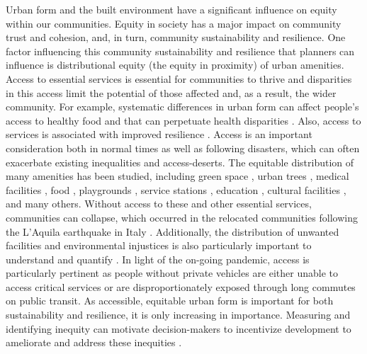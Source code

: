 \documentclass[final,3p,times,onecolumn,sort&compress]{elsarticle}
\begin{document}
Urban form and the built environment have a significant influence on equity within our communities.
Equity in society has a major impact on community trust and cohesion, and, in turn, community sustainability and resilience.
One factor influencing this community sustainability and resilience that planners can influence is distributional equity (the equity in proximity) of urban amenities.
Access to essential services is essential for communities to thrive \cite{Dempsey2011-og, United_Nations_Educational_Scientific_and_Cultural_Organization2018-sf, Winter1997-kc} and disparities in this access limit the potential of those affected and, as a result, the wider community.
For example, systematic differences in urban form can affect people's access to healthy food and that can perpetuate health disparities \citep{Kolak2018-az}.
Also, access to services is associated with improved resilience \cite{Frazier2013-ct}.
Access is an important consideration both in normal times as well as following disasters, which can often exacerbate existing inequalities and access-deserts.
The equitable distribution of many amenities has been studied, including green space \citep{Rigolon2018-jl}, urban trees \citep{Schwarz2015-fs}, medical facilities \citep{Apparicio2008-nq}, food \citep{Walker2010-ch}, playgrounds \citep{Talen1998-mk}, service stations \citep{Logan2020-vj}, education \citep{Pacione1989-ui}, cultural facilities \citep{United_Nations_Educational_Scientific_and_Cultural_Organization2018-sf}, and many others. 
Without access to these and other essential services, communities can collapse, which occurred in the relocated communities following the L'Aquila earthquake in Italy \citep{Contreras2017-yq}.
Additionally, the distribution of unwanted facilities and environmental injustices is also particularly important to understand and quantify \citep{Talen1998-fl}.
In light of the on-going pandemic, access is particularly pertinent as people without private vehicles are either unable to access critical services or are disproportionately exposed through long commutes on public transit.
As accessible, equitable urban form is important for both sustainability and resilience, it is only increasing in importance. 
Measuring and identifying inequity can motivate decision-makers to incentivize development to ameliorate and address these inequities \citep{Kolak2018-az}.
\end{document}
